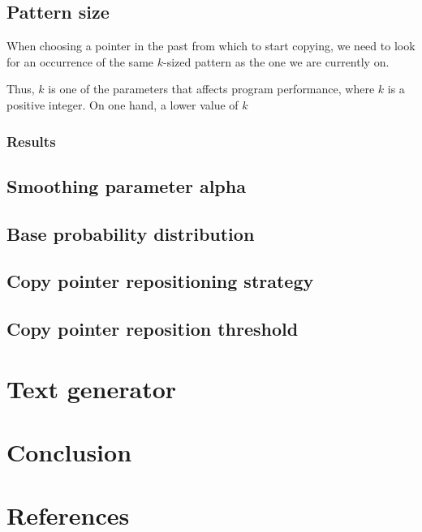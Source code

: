 \documentclass{article}
\begin{document}

\subsection{Pattern size}

When choosing a pointer in the past from which to start copying,
we need to look for an occurrence of the same $k$-sized pattern as the
one we are currently on.

Thus, $k$ is one of the parameters that affects program performance, where $k$ is a positive integer.
On one hand, a lower value of $k$

\subsubsection{Results}

\subsection{Smoothing parameter alpha}
\subsection{Base probability distribution}
\subsection{Copy pointer repositioning strategy}
\subsection{Copy pointer reposition threshold}

\section{Text generator}

\section{Conclusion}

\section{References}


\end{document}
